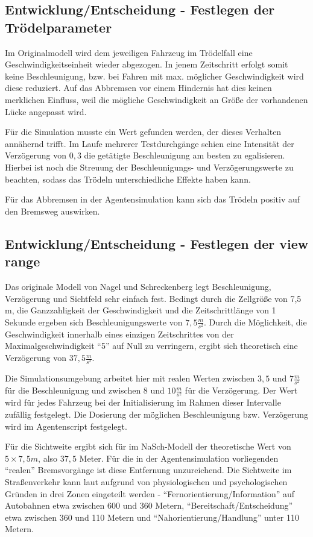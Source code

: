 \subsection{Entwicklung/Entscheidung - Festlegen der Trödelparameter}
\label{sec:lingersweetspot}

Im Originalmodell wird dem jeweiligen Fahrzeug im Trödelfall eine Geschwindigkeitseinheit wieder abgezogen. 
In jenem Zeitschritt erfolgt somit keine Beschleunigung, bzw. bei Fahren mit max. möglicher Geschwindigkeit wird diese reduziert. 
Auf das Abbremsen vor einem Hindernis hat dies keinen merklichen Einfluss, weil die mögliche Geschwindigkeit an Größe der vorhandenen Lücke angepasst wird.

Für die Simulation musste ein Wert gefunden werden, der dieses Verhalten annähernd trifft.
Im Laufe mehrerer Testdurchgänge schien eine Intensität der Verzögerung von $0,3$ die getätigte Beschleunigung am besten zu egalisieren. 
Hierbei ist noch die Streuung der Beschleunigungs- und Verzögerungswerte zu beachten, sodass das Trödeln unterschiedliche Effekte haben kann.

Für das Abbremsen in der Agentensimulation kann sich das Trödeln positiv auf den Bremsweg auswirken.



\subsection{Entwicklung/Entscheidung - Festlegen der view range}

Das originale Modell von Nagel und Schreckenberg legt Beschleunigung, Verzögerung und Sichtfeld sehr einfach fest.
Bedingt durch die Zellgröße von 7,5 m, die Ganzzahligkeit der Geschwindigkeit und die Zeitschrittlänge von 1 Sekunde ergeben sich Beschleunigungswerte von $7,5 \frac{m}{s^{2}}$. 
Durch die Möglichkeit, die Geschwindigkeit innerhalb eines einzigen Zeitschrittes von der Maximalgeschwindigkeit \enquote{5} auf Null zu verringern, ergibt sich theoretisch eine Verzögerung von $37,5 \frac{m}{s^{2}}$.

Die Simulationsumgebung arbeitet hier mit realen Werten zwischen $3,5$ und $7 \frac{m}{s^{2}}$ für die Beschleunigung und zwischen $8$ und $10 \frac{m}{s^{2}}$ für die Verzögerung.
Der Wert wird für jedes Fahrzeug bei der Initialisierung im Rahmen dieser Intervalle zufällig festgelegt.
Die Dosierung der möglichen Beschleunigung bzw. Verzögerung wird im Agentenscript festgelegt.

Für die Sichtweite ergibt sich für im NaSch-Modell der theoretische Wert von $5 \times 7,5 m$, also $37,5$ Meter.
Für die in der Agentensimulation vorliegenden \enquote{realen} Bremsvorgänge ist diese Entfernung unzureichend. 
Die Sichtweite im Straßenverkehr kann laut \cite{sichtweite} aufgrund von physiologischen und psychologischen Gründen in drei Zonen eingeteilt werden - \enquote{Fernorientierung/Information} auf Autobahnen etwa zwischen 600 und 360 Metern, \enquote{Bereitschaft/Entscheidung} etwa zwischen 360 und 110 Metern und \enquote{Nahorientierung/Handlung} unter 110 Metern.

